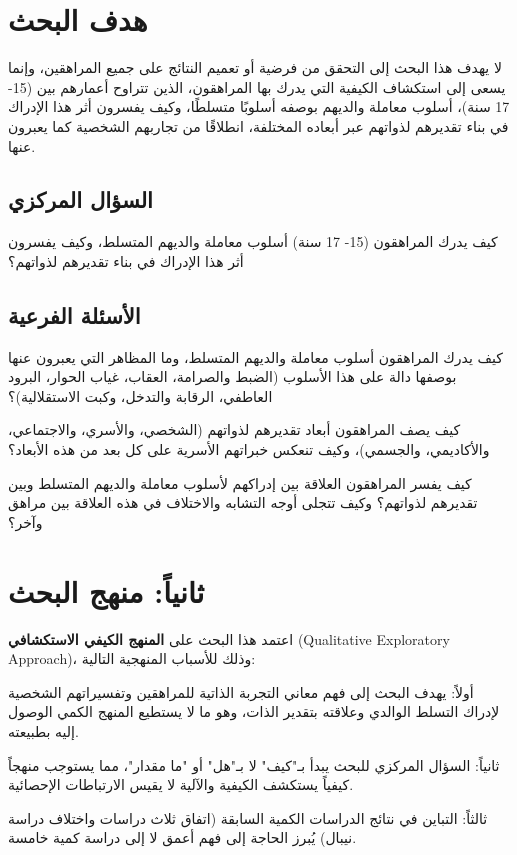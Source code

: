 \documentclass[12pt,oneside]{report}
\begin{document}
\section{هدف البحث}
لا يهدف هذا البحث إلى التحقق من فرضية أو تعميم النتائج على جميع المراهقين، وإنما يسعى إلى استكشاف الكيفية التي يدرك بها المراهقون، الذين تتراوح أعمارهم بين (15- 17 سنة)، أسلوب معاملة والديهم بوصفه أسلوبًا متسلطًا، وكيف يفسرون أثر هذا الإدراك في بناء تقديرهم لذواتهم عبر أبعاده المختلفة، انطلاقًا من تجاربهم الشخصية كما يعبرون عنها.

\subsection{السؤال المركزي}
كيف يدرك المراهقون (15- 17 سنة) أسلوب معاملة والديهم المتسلط، وكيف يفسرون أثر هذا الإدراك في بناء تقديرهم لذواتهم؟

\subsection{الأسئلة الفرعية}
كيف يدرك المراهقون أسلوب معاملة والديهم المتسلط، وما المظاهر التي يعبرون عنها بوصفها دالة على هذا الأسلوب (الضبط والصرامة، العقاب، غياب الحوار، البرود العاطفي، الرقابة والتدخل، وكبت الاستقلالية)؟

كيف يصف المراهقون أبعاد تقديرهم لذواتهم (الشخصي، والأسري، والاجتماعي، والأكاديمي، والجسمي)، وكيف تنعكس خبراتهم الأسرية على كل بعد من هذه الأبعاد؟

كيف يفسر المراهقون العلاقة بين إدراكهم لأسلوب معاملة والديهم المتسلط وبين تقديرهم لذواتهم؟ وكيف تتجلى أوجه التشابه والاختلاف في هذه العلاقة بين مراهق وآخر؟

\section{ثانياً: منهج البحث}
اعتمد هذا البحث على \textbf{المنهج الكيفي الاستكشافي} (Qualitative Exploratory Approach)، وذلك للأسباب المنهجية التالية:

أولاً: يهدف البحث إلى فهم معاني التجربة الذاتية للمراهقين وتفسيراتهم الشخصية لإدراك التسلط الوالدي وعلاقته بتقدير الذات، وهو ما لا يستطيع المنهج الكمي الوصول إليه بطبيعته.

ثانياً: السؤال المركزي للبحث يبدأ بـ"كيف" لا بـ"هل" أو "ما مقدار"، مما يستوجب منهجاً كيفياً يستكشف الكيفية والآلية لا يقيس الارتباطات الإحصائية.

ثالثاً: التباين في نتائج الدراسات الكمية السابقة (اتفاق ثلاث دراسات واختلاف دراسة نيبال) يُبرز الحاجة إلى فهم أعمق لا إلى دراسة كمية خامسة.
\end{document}
